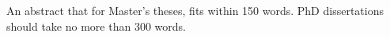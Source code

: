 \chapter*{\uppercase{}}\label{ch:abstract}

An abstract that for Master's theses, fits within 150 words. PhD dissertations should take no more than 300 words.
